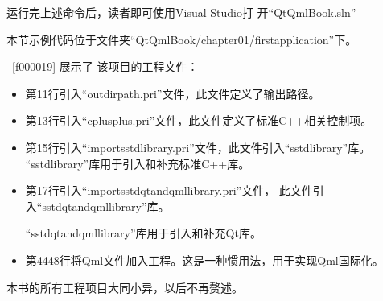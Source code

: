 运行完上述命令后，读者即可使用Visual Studio打
开“QtQmlBook.sln”

本节示例代码位于文件夹“QtQmlBook/chapter01/firstapplication”下。

\filesourcenumbernameone\ \ref{f000019}
展示了
该项目的工程文件：

\begin{itemize}
\item 第11行引入“outdirpath.pri”文件，此文件定义了输出路径。
\item 第13行引入“cplusplus.pri”文件，此文件定义了标准C{\sourcefonttwo{}+}{\sourcefonttwo{}+}相关控制项。
\item 第15行引入“import\underline{\hspace{0.5em}}sstd\underline{\hspace{0.5em}}library.pri”文件，此文件引入“sstd\underline{\hspace{0.5em}}library”库。
“sstd\underline{\hspace{0.5em}}library”库用于引入和补充标准C{\sourcefonttwo{}+}{\sourcefonttwo{}+}库。
\item 第17行引入“import\underline{\hspace{0.5em}}sstd\underline{\hspace{0.5em}}qt\underline{\hspace{0.5em}}and\underline{\hspace{0.5em}}qml\underline{\hspace{0.5em}}library.pri”文件，
此文件引入“sstd\underline{\hspace{0.5em}}\-qt\underline{\hspace{0.5em}}\-and\underline{\hspace{0.5em}}\-qml\underline{\hspace{0.5em}}\-library”库。

“sstd\underline{\hspace{0.5em}}qt\underline{\hspace{0.5em}}and\underline{\hspace{0.5em}}qml\underline{\hspace{0.5em}}library”库用于引入和补充Qt库。
\item 第44\raisebox{0.16ex}{\sourcefonttwo\~{}}48行将Qml文件加入工程。这是一种惯用法，用于实现Qml国际化。
\end{itemize}

本书的所有工程项目大同小异，以后不再赘述。

